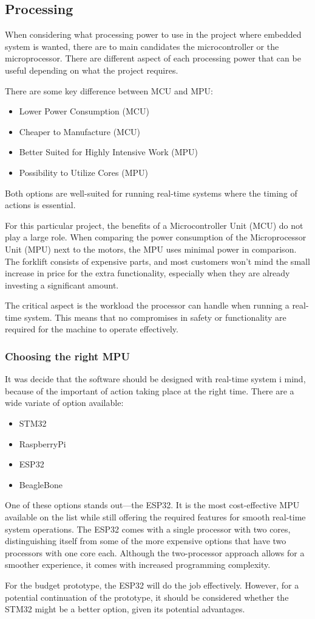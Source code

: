 \documentclass[../report.tex]{subfiles}
\begin{document}
\subsection{Processing}
    When considering what processing power to use in the project where embedded
    system is wanted, there are to main candidates the microcontroller or the
    microprocessor. There are different aspect of each processing power that
    can be useful depending on what the project requires. 

    There are some key difference between MCU and MPU:
    \begin{itemize}
        \item Lower Power Consumption (MCU)
        \item Cheaper to Manufacture (MCU)
        \item Better Suited for Highly Intensive Work (MPU)
        \item Possibility to Utilize Cores (MPU)
    \end{itemize}

    Both options are well-suited for running real-time systems where the timing
    of actions is essential.

    For this particular project, the benefits of a Microcontroller Unit (MCU)
    do not play a large role. When comparing the power consumption of the
    Microprocessor Unit (MPU) next to the motors, the MPU uses minimal power in
    comparison. The forklift consists of expensive parts, and most customers
    won't mind the small increase in price for the extra functionality,
    especially when they are already investing a significant amount.
    
    The critical aspect is the workload the processor can handle when running a
    real-time system. This means that no compromises in safety or functionality
    are required for the machine to operate effectively.

    \subsubsection{Choosing the right MPU}
    It was decide that the software should be designed with real-time system i
    mind, because of the important of action taking place at the right time.
    There are a wide variate of option available:
    \begin{itemize}
        \item STM32
        \item RaspberryPi
        \item ESP32
        \item BeagleBone
    \end{itemize} 
    One of these options stands out—the ESP32. It is the most cost-effective
    MPU available on the list while still offering the required features for
    smooth real-time system operations. The ESP32 comes with a single processor
    with two cores, distinguishing itself from some of the more expensive
    options that have two processors with one core each. Although the
    two-processor approach allows for a smoother experience, it comes with
    increased programming complexity.

    For the budget prototype, the ESP32 will do the job effectively. However,
    for a potential continuation of the prototype, it should be considered
    whether the STM32 might be a better option, given its potential advantages.
\end{document}
